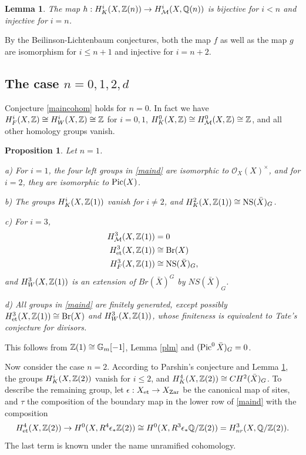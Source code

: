 \documentclass[nospthms,envcountsect]{svmult} %
\newtheorem{lemma}      [theorem]       {Lemma}
\newtheorem{proposition}[theorem]       {Proposition}
\begin{document}
\begin{lemma}\label{lowdegree}
The map $h:H^i_K(X,{{\mathbb Z}}(n))\to H^i_{\mathcal M}(X,{{\mathbb Q}}(n))$ 
is bijective for $i<n$ and injective for $i=n$.
\end{lemma}


\proof
By the Beilinson-Lichtenbaum conjectures, both the map 
$f$ as well as the map $g$ are isomorphism for $i\leq n+1$
and injective for $i=n+2$.
\proofend





\subsection{The case $n=0, 1, 2, d$}
Conjecture \ref{maincohom} holds for $n=0$. In fact we have
$H^i_F(X,{{\mathbb Z}})\cong  H^i_W(X,{{\mathbb Z}})\cong {{\mathbb Z}}$ for $i=0,1$,
$H^0_K(X,{{\mathbb Z}})\cong H^0_{\mathcal M}(X,{{\mathbb Z}})\cong {{\mathbb Z}}$, and all 
other homology groups vanish.


\begin{proposition} Let $n=1$. 

a) For $i=1$, the four left groups in \eqref{maind} are isomorphic to 
${\mathcal O}_X(X)^\times$, and for $i=2$, they are isomorphic
to $\operatorname{Pic}(X)$.

b) The groups $H^i_K(X,{{\mathbb Z}}(1))$ vanish for $i\not=2$, and
$H^2_K(X,{{\mathbb Z}}(1))\cong \operatorname{NS}(\bar X)_G$.

c) For $i=3$, 
\begin{align*}
H^3_{\mathcal M}(X,{{\mathbb Z}}(1))&=0\\
H^3_{\text{\rm et}}(X,{{\mathbb Z}}(1))&\cong \operatorname{Br}(X)\\
H^3_F(X,{{\mathbb Z}}(1))&\cong \operatorname{NS}(\bar X)_G,
\end{align*}
and $H^3_W(X,{{\mathbb Z}}(1))$ is an extension of $Br(\bar X)^G$
by $NS(\bar X)_G$. 

d) All groups in \eqref{maind} are finitely generated,
except possibly $H^3_{\text{\rm et}}(X,{{\mathbb Z}}(1))\cong \operatorname{Br}(X)$ and 
$H^3_W(X,{{\mathbb Z}}(1))$, 
whose finiteness is equivalent to Tate's conjecture for divisors.
\end{proposition} 

\proof This follows from ${{\mathbb Z}}(1)\cong {\mathbb G}_m[-1]$, Lemma \ref{plm}
and $(\operatorname{Pic}^0 \bar X)_G =0$.
\proofend


Now consider the case $n=2$. According to Parshin's conjecture
and Lemma \ref{lowdegree}, the groups $H^i_K(X,{{\mathbb Z}}(2))$ vanish for $i\leq 2$,
and $H^4_K(X,{{\mathbb Z}}(2))\cong CH^2(\bar X)_G$. To describe the remaining
group, let $\epsilon:X_{{\text{\rm et}}}\to X_{{\text{\rm Zar}}}$ be the canonical map of sites, and 
$\tau$ the composition of the boundary map in 
the lower row of \eqref{maind} with the composition
$$H^4_{\text{\rm et}}(X,{{\mathbb Z}}(2))\to H^0(X,R^4\epsilon_*{{\mathbb Z}}(2))\cong H^0(X,R^3\epsilon_*{{\mathbb Q}}/{{\mathbb Z}}(2))
=H^3_{nr}(X,{{\mathbb Q}}/{{\mathbb Z}}(2)).$$
The last term is known under the name unramified cohomology.
\end{document}
